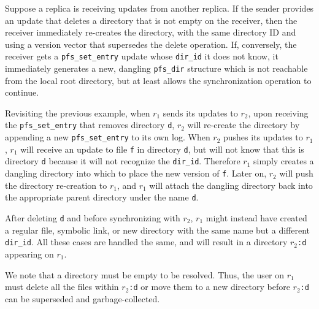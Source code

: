 Suppose a replica is receiving updates from another replica.  If the
sender provides an update that deletes a directory that is not empty
on the receiver, then the receiver immediately re-creates the
directory, with the same directory ID and using a version vector that
supersedes the delete operation.  If, conversely, the receiver gets a
{\tt pfs\_set\_entry} update whose {\tt dir\_id} it does not know, it
immediately generates a new, dangling {\tt pfs\_dir} structure which
is not reachable from the local root directory, but at least allows
the synchronization operation to continue.

Revisiting the previous example, when $r_1$ sends its updates to
$r_2$, upon receiving the \texttt{pfs\_set\_entry} that removes
directory \texttt{d}, $r_2$ will re-create the directory by appending
a new \texttt{pfs\_set\_entry} to its own log.  When $r_2$ pushes its
updates to $r_1$, $r_1$ will receive an update to file \texttt{f} in
directory \texttt{d}, but will not know that this is directory
\texttt{d} because it will not recognize the \texttt{dir\_id}.
Therefore $r_1$ simply creates a dangling directory into which to
place the new version of \texttt{f}.  Later on, $r_2$ will push the
directory re-creation to $r_1$, and $r_1$ will attach the dangling
directory back into the appropriate parent directory under the name
\texttt{d}.

After deleting \texttt{d} and before synchronizing with $r_2$, $r_1$
might instead have created a regular file, symbolic link, or new
directory with the same name but a different \texttt{dir\_id}.  All
these cases are handled the same, and will result in a directory
\texttt{$r_2$:d} appearing on $r_1$.

We note that a directory must be empty to be resolved.  Thus, the user
on $r_1$ must delete all the files within \texttt{$r_2$:d} or move
them to a new directory before \texttt{$r_2$:d} can be superseded and
garbage-collected.

\endinput

Such situation may arise if the updates are not propagated according
to the same order as the one they have been originally generated
with. If all updates are subsequently propagated, an update relative
to the new directory will follow and will allow its insertion in the
local tree. This behavior gives the {\tt pfs\_set\_entry} updates a
very useful property : \emph{a given set of updates will result in the
same local tree structure regardless of the order in which the updates
are performed.}

